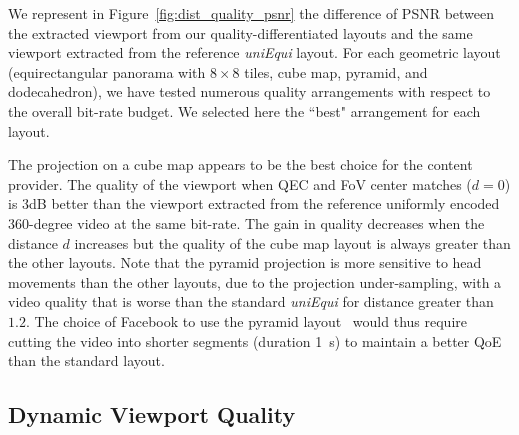 We represent in Figure~\ref{fig:dist_quality_psnr} the difference of \ac{PSNR} between
the extracted viewport from our quality-differentiated layouts and the same viewport extracted from
the reference \textit{uniEqui} layout. For each geometric layout (equirectangular 
panorama with $8\times 8$ tiles, cube map, pyramid, and dodecahedron), we have tested 
numerous quality arrangements with respect to the overall bit-rate budget. We selected
here the ``best" arrangement for each layout.

The projection on a cube map appears to be the best choice for the content provider. The quality of
the viewport when QEC and FoV center matches ($d=0$) is 3dB better than the viewport extracted
from the reference uniformly encoded 360-degree video at the same bit-rate. The gain in quality 
decreases when the distance $d$ increases but the quality of the cube map layout is always greater 
than the other layouts. Note that the pyramid projection is more sensitive to head movements than
the other layouts, due to the projection under-sampling, with a video quality that is worse than
the standard \emph{uniEqui} for distance greater than $1.2$. The choice of Facebook to 
use the pyramid
layout~\cite{facebook} would thus require cutting the video into shorter segments 
(duration \SI{1}{\second}) to maintain a better \ac{QoE} than the standard layout.

%    

\subsection{Dynamic Viewport Quality}
\label{sec:qoe}